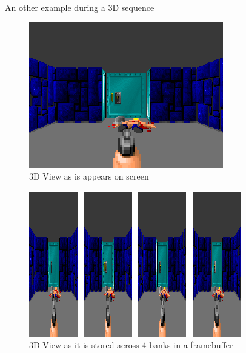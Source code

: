 \documentclass[book.tex]{subfiles}
\begin{document}
\par
An other example during a 3D sequence
\begin{figure}[H]
\centering
 \includegraphics[width=\textwidth]{imgs/vga_layout/wolf3d_7.png}
 \caption{3D View as is appears on screen} \label{fig:vga_layout_in_3D}
 \end{figure}
 \par

 \begin{figure}[H]
\centering
 \includegraphics[width=\textwidth]{imgs/vga_layout/wolf3d_7_bank.png}
 \caption{3D View as it is stored across 4 banks in a framebuffer}
 \end{figure}
\end{document}
